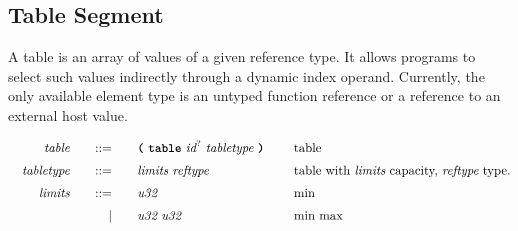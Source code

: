 \subsection{Table Segment}


A table is an array of values of a given reference type. It allows programs to select such values
indirectly through a dynamic index operand. Currently, the only available element type is an untyped function reference or a reference to an external host value.

\begin{alignat*}{9}
    && \textit{table}    &&\quad ::= &\quad && \textbf{\texttt{(}}\ \textbf{\texttt{table}}\ \textit{id}^?\ \textit{tabletype}\ \textbf{\texttt{)}}\ \quad && \textrm{table} \\[1mm]
    && \textit{tabletype}&&\quad ::= &\quad && \textit{limits}\ \textit{reftype}\ \quad && \textrm{table with} \ \textit{limits} \ \textrm{capacity,} \ \textit{reftype} \ \textrm{type.} \\[1mm]
    && \textit{limits}  &&\quad ::= &\quad && \textit{u32}\ \quad && \textrm{min} \\[1mm]
    &&                  &&\quad  |  &\quad && \textit{u32}\ \textit{u32}\ && \textrm{min max} \\[1mm]
\end{alignat*}